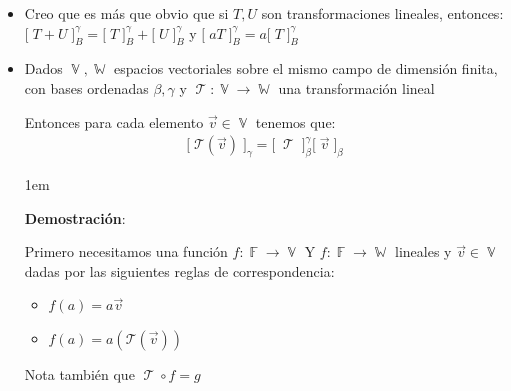 \documentclass[12pt, fleqn]{report}                             %
\newenvironment{SmallIndentation}[1][0.75em]                    %
        {\begin{adjustwidth}{#1}{}\begin{footnotesize}}             %
        {\end{footnotesize}\end{adjustwidth}}                       %
\theoremstyle{break}                                            %
\DeclareMathOperator \GenericField {\mathbb{F}}                 %
\DeclareMathOperator \VectorSet    {\mathbb{V}}                 %
\DeclareMathOperator \SubVectorSet {\mathbb{W}}                 %
\DeclareMathOperator \LinTrans      {\mathcal{T}}               %
\newcommand{\Wrap}[1]           {\left( #1 \right)}             %
\newcommand{\bigBrackets}[1]    {\big[ \; #1 \; \big]}          %
\newcommand{\FnLinTrans}[1]{\mathcal{T}\Wrap{#1}}               %
\begin{document}
                \begin{itemize}
                    
                    \item 
                        Creo que es más que obvio que si $T, U$ son transformaciones
                        lineales, entonces:
                        $\bigBrackets{T + U}_B^\gamma = \bigBrackets{T}_B^\gamma + \bigBrackets{U}_B^\gamma$
                        y $\bigBrackets{aT}_B^\gamma = a\bigBrackets{T}_B^\gamma$

                    \item
                        Dados $\VectorSet, \SubVectorSet$ espacios vectoriales sobre el mismo campo
                        de dimensión finita, con bases ordenadas
                        $\beta, \gamma$ y $\LinTrans: \VectorSet \to \SubVectorSet$ una transformación lineal

                        Entonces para cada elemento $\vec v \in \VectorSet$
                        tenemos que:
                        \begin{align*}
                            \bigBrackets{\FnLinTrans{\vec v}}_\gamma =
                                \bigBrackets{\LinTrans}_\beta^\gamma 
                                \bigBrackets{\vec v}_\beta 
                        \end{align*}

                        \begin{SmallIndentation}[1em]
                            \textbf{Demostración}:
                            
                            Primero necesitamos una función $f: \GenericField \to \VectorSet$
                            Y $f: \GenericField \to \SubVectorSet$ lineales y $\vec v \in \VectorSet$
                            dadas por las siguientes reglas de correspondencia:
                            \begin{itemize}
                                \item $f(a) = a \vec v$
                                \item $f(a) = a (\FnLinTrans{\vec v})$
                            \end{itemize}

                            Nota también que $\LinTrans \circ f = g$


\end{SmallIndentation}
\end{itemize}
\end{document}
